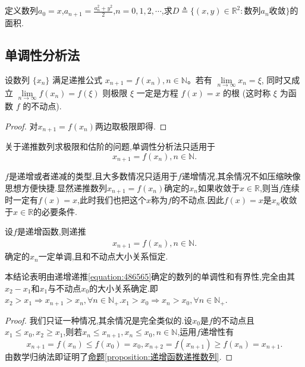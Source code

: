 \documentclass[../../main.tex]{subfiles}%
\begin{document}
\begin{example}
定义数列\(a_0 = x\),\(a_{n + 1}=\frac{a_{n}^{2}+y^{2}}{2}\),\(n = 0,1,2,\cdots\),求\(D\triangleq\{(x,y)\in\mathbb{R}^2:\text{数列}a_n\text{收敛}\}\)的面积.
\end{example}
\begin{solution}


\end{solution}





\subsection{单调性分析法}

\begin{proposition}[不动点]\label{proposition:不动点}
设数列 \(\{x_n\}\) 满足递推公式 \(x_{n+1} = f(x_n), n \in \mathbb{N}\)。若有 \(\lim\limits_{n \to \infty} x_n = \xi\), 同时又成立 \(\lim\limits_{n \to \infty} f(x_n) = f(\xi)\) 则极限 \(\xi\) 一定是方程 \(f(x) = x\) 的根 (这时称 \(\xi\) 为函数 \(f\) 的不动点).
\end{proposition}
\begin{proof}
对$x_{n+1} = f(x_n)$两边取极限即得.
\end{proof}

关于递推数列求极限和估阶的问题,单调性分析法只适用于
\[
x_{n + 1} = f(x_n),n \in \mathbb{N}.
\]

\(f\)是递增或者递减的类型,且大多数情况只适用于\(f\)递增情况,其余情况不如压缩映像思想方便快捷.显然递推数列$x_{n + 1} = f(x_n)$确定的\(x_n\)如果收敛于\(x \in \mathbb{R}\),则当\(f\)连续时一定有\(f(x) = x\),此时我们也把这个\(x\)称为\(f\)的不动点.因此\(f(x) = x\)是\(x_n\)收敛于\(x \in \mathbb{R}\)的必要条件.



\begin{proposition}[递增函数递推数列]\label{proposition:递增函数递推数列}
设\(f\)是递增函数,则递推
\begin{align}\label{equation:486565}
x_{n + 1} = f(x_n),n \in \mathbb{N}.
\end{align}
确定的\(x_n\)一定单调,且和不动点大小关系恒定.
\end{proposition}
\begin{note}
本结论表明由递增递推\eqref{equation:486565}确定的数列的单调性和有界性,完全由其\(x_2 - x_1\)和\(x_1\)与不动点$x_0$的大小关系确定.即$x_2>x_1\Rightarrow x_{n+1}>x_n,\forall n\in \mathbb{N} _+.x_1>x_0\Rightarrow x_n>x_0,\forall n\in \mathbb{N} _+$.
\end{note}
\begin{proof}
我们只证一种情况,其余情况是完全类似的.设\(x_0\)是\(f\)的不动点且\(x_1\leqslant  x_0,x_2\geqslant  x_1\),则若\(x_n\leqslant  x_{n + 1},x_n\leqslant  x_0,n\in\mathbb{N}\),运用\(f\)递增性有
\[
x_{n + 1} = f(x_n)\leqslant  f(x_0) = x_0,x_{n + 2} = f(x_{n + 1})\geqslant  f(x_n) = x_{n + 1}.
\]
由数学归纳法即证明了\hyperref[proposition:递增函数递推数列]{命题\ref{proposition:递增函数递推数列}}.
\end{proof}
\end{document}
